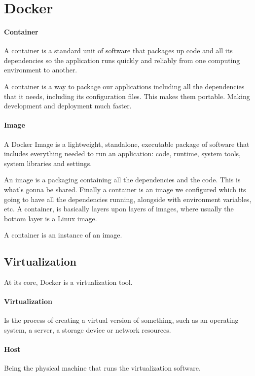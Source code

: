 \documentclass[a4paper]{article}
\begin{document}
    \newpage
    \section{Docker}
    \paragraph{Container} A container is a standard unit of software that packages up code and all its dependencies so the application runs quickly and reliably from one computing environment to another.

    A container is a way to package our applications including all the dependencies that it needs, including its configuration files. This makes them portable. Making development and deployment much faster. 

    \paragraph*{Image} A Docker Image is a lightweight, standalone, executable package of software that includes everything needed to run an application: code, runtime, system tools, system libraries and settings.

    An image is a packaging containing all the dependencies and the code. This is what's gonna be shared. Finally a container is an image we configured which its going to have all the dependencies running, alongside with environment variables, etc. A container, is basically layers upon layers of images, where usually the bottom layer is a Linux image. 

    A container is an instance of an image.

    \subsection{Virtualization}

    At its core, Docker is a virtualization tool. 

    \paragraph*{Virtualization} Is the process of creating a virtual version of something, such as an operating system, a server, a storage device or network resources. 

    \paragraph{Host} Being the physical machine that runs the virtualization software.
\end{document}
